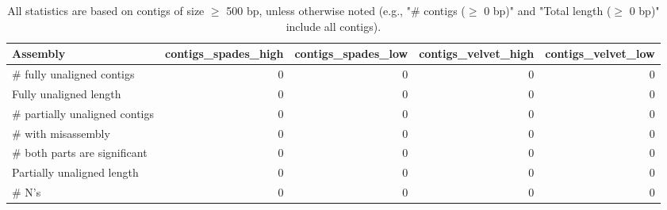 \documentclass[12pt,a4paper]{article}
\begin{document}
\begin{table}[ht]
\begin{center}
\caption{All statistics are based on contigs of size $\geq$ 500 bp, unless otherwise noted (e.g., "\# contigs ($\geq$ 0 bp)" and "Total length ($\geq$ 0 bp)" include all contigs).}
\begin{tabular}{|l*{4}{|r}|}
\hline
Assembly & contigs\_spades\_high & contigs\_spades\_low & contigs\_velvet\_high & contigs\_velvet\_low \\ \hline
\# fully unaligned contigs & 0 & 0 & 0 & 0 \\ \hline
Fully unaligned length & 0 & 0 & 0 & 0 \\ \hline
\# partially unaligned contigs & 0 & 0 & 0 & 0 \\ \hline
\hspace{5mm}\# with misassembly & 0 & 0 & 0 & 0 \\ \hline
\hspace{5mm}\# both parts are significant & 0 & 0 & 0 & 0 \\ \hline
Partially unaligned length & 0 & 0 & 0 & 0 \\ \hline
\# N's & 0 & 0 & 0 & 0 \\ \hline
\end{tabular}
\end{center}
\end{table}
\end{document}
